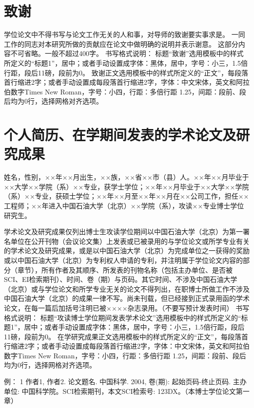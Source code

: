 \chapter{致\quad 谢}%
学位论文中不得书写与论文工作无关的人和事，对导师的致谢要实事求是。
一同工作的同志对本研究所做的贡献应在论文中做明确的说明并表示谢意。
这部分内容不可省略。一般不超过400字。
书写格式说明：
标题“致谢”选用模板中的样式所定义的“标题1”，居中；或者手动设置成字体：黑体，居中，字号：小三，1.5倍行距，段后11磅，段前为0。
致谢正文选用模板中的样式所定义的“正文”，每段落首行缩进2字；或者手动设置成每段落首行缩进2字，字体：中文宋体，英文和阿拉伯数字Times New Roman，字号：小四，行距：多倍行距 1.25，间距：段前、段后均为0行，选择网格对齐选项。


\chapter{个人简历、在学期间发表的学术论文及研究成果}

姓名，性别，××年××月出生，××族，××省××市（县）人。××年××月毕业于××大学××学院（系）××专业，获学士学位；××年××月毕业于××大学××学院（系）××专业，获硕士学位；××年××月至××年××月在××公司工作，担任××工程师；××年进入中国石油大学（北京）××学院（系），攻读××专业博士学位研究生。

学术论文及研究成果仅列出博士生攻读学位期间以中国石油大学（北京）为第一署名单位在公开刊物（会议论文集）上发表或已被录用的与学位论文或所学专业有关的学术论文及研究成果，或是以中国石油大学（北京）为完成单位之一获得的奖励或以中国石油大学（北京）为专利权人申请的专利，并注明属于学位论文内容的部分（章节），所有作者及其顺序、所发表的刊物名称（包括主办单位、是否被SCI、EI检索期刊）、时间、卷（期）与页码。其它时间、不涉及中国石油大学（北京）或与学位论文和所学专业无关的论文不得列出，在职博士所做工作不涉及中国石油大学（北京）的成果一律不写。尚未刊载，但已经接到正式录用函的学术论文，在每一篇后加括号注明已被××××杂志录用。（不要写预计发表时间）
书写格式说明：
标题“攻读博士学位期间发表学术论文”选用模板中的样式所定义的“标题1”，居中；或者手动设置成字体：黑体，居中，字号：小三，1.5倍行距，段后11磅，段前为0。
在学研究成果正文选用模板中的样式所定义的“正文”，每段落首行缩进2字；或者手动设置成每段落首行缩进2字，字体：中文宋体，英文和阿拉伯数字Times New Roman，字号：小四，行距：多倍行距 1.25，间距：段前、段后均为0行，选择网格对齐选项。

例：
1	作者1, 作者2. 论文题名. 中国科学. 2004, 卷(期): 起始页码-终止页码. 主办单位: 中国科学院。SCI检索期刊，本文SCI检索号: 123DX。（本博士学位论文第一章）


\cleardoublepage[plain]%

